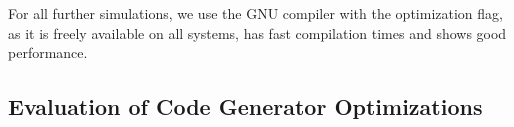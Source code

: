 For all further simulations, we use the GNU compiler with the  optimization flag, as it is freely available on all systems, has fast compilation times and shows good performance.






\subsection{Evaluation of Code Generator Optimizations}


